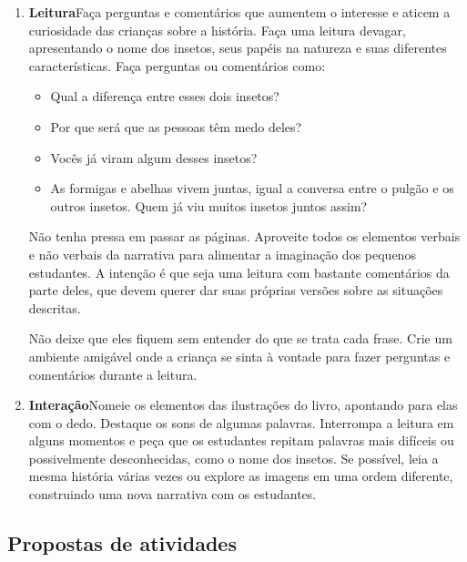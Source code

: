 \documentclass[11pt]{extarticle}
\begin{document}
\begin{enumerate}
\item \textbf{Leitura}\quad Faça perguntas e comentários que aumentem o 
interesse e aticem a curiosidade das crianças sobre a história.
Faça uma leitura devagar, apresentando o nome dos insetos, seus papéis na natureza e suas diferentes características.
Faça  perguntas ou comentários como: 

\begin{itemize}
\item Qual a diferença entre esses dois insetos?
\item Por que será que as pessoas têm medo deles?
\item Vocês já viram algum desses insetos?
\item As formigas e abelhas vivem juntas, igual a conversa entre o pulgão e os outros insetos. Quem já viu muitos insetos juntos assim?
\end{itemize}

Não tenha pressa em passar as páginas. Aproveite todos
os elementos verbais e não verbais da narrativa
para alimentar a imaginação dos pequenos estudantes. 
A intenção é que seja uma leitura com bastante comentários
da parte deles, que devem querer dar suas próprias versões
sobre as situações descritas.

Não deixe que eles fiquem sem entender do que se trata cada frase. Crie 
um ambiente amigável onde a criança se sinta à vontade para fazer 
perguntas e comentários durante a leitura.


\item \textbf{Interação}\quad Nomeie os elementos das ilustrações 
do livro, apontando para elas com o dedo. Destaque os sons de algumas 
palavras. Interrompa a leitura em alguns momentos e peça que 
os estudantes repitam palavras mais difíceis ou possivelmente desconhecidas, como o nome dos insetos. Se possível, 
leia a mesma história várias vezes ou explore as imagens em uma ordem 
diferente, construindo uma nova narrativa com os estudantes. 
\end{enumerate}


\subsection{Propostas de atividades}


\end{document}
